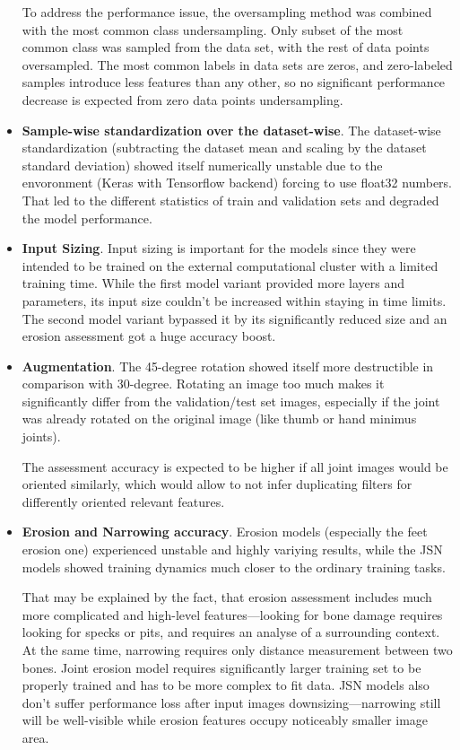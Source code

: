 \documentclass[thesis=B,english]{FITthesis}[2019/12/23]
\begin{document}
\begin{itemize}
	To address the performance issue, the oversampling method was combined with the most common class undersampling. Only subset of the most common class was sampled from the data set, with the rest of data points oversampled. The most common labels in data sets are zeros, and zero-labeled samples introduce less features than any other, so no significant performance decrease is expected from zero data points undersampling. 
	
	\item \textbf{Sample-wise standardization over the dataset-wise}. The dataset-wise standardization (subtracting the dataset mean and scaling by the dataset standard deviation) showed itself numerically unstable due to the envoronment (Keras with Tensorflow backend) forcing to use float32 numbers. That led to the different statistics of train and validation sets and degraded the model performance.
	
	\item \textbf{Input Sizing}. Input sizing is important for the models since they were intended to be trained on the external computational cluster with a limited training time. While the first model variant provided more layers and parameters, its input size couldn't be increased within staying in time limits. The second model variant bypassed it by its significantly reduced size and an erosion assessment got a huge accuracy boost.
	
	\item \textbf{Augmentation}. The 45-degree rotation showed itself more destructible in comparison with 30-degree. Rotating an image too much makes it significantly differ from the validation/test set images, especially if the joint was already rotated on the original image (like thumb or hand minimus joints).
	
	The assessment accuracy is expected to be higher if all joint images would be oriented similarly, which would allow to not infer duplicating filters for differently oriented relevant features.
	
	\item \textbf{Erosion and Narrowing accuracy}. Erosion models (especially the feet erosion one) experienced unstable and highly variying results, while the JSN models showed training dynamics much closer to the ordinary training tasks.
	
	That may be explained by the fact, that erosion assessment includes much more complicated and high-level features---looking for bone damage requires looking for specks or pits, and requires an analyse of a surrounding context. At the same time, narrowing requires only distance measurement between two bones. Joint erosion model requires significantly larger training set to be properly trained and has to be more complex to fit data. JSN models also don't suffer performance loss after input images downsizing---narrowing still will be well-visible while erosion features occupy noticeably smaller image area.
	

\end{itemize}
\end{document}
